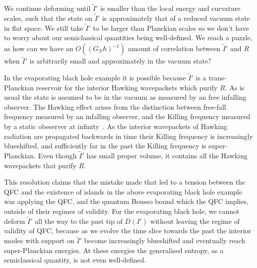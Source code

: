 \documentclass[a4paper,11pt]{article}
\begin{document}
\iffalse

We continue deforming until $\tilde{I}'$ is smaller than the local energy and curvature scales, such that the state on $\tilde{I}'$ is approximately that of a reduced vacuum state in flat space. We still take $\tilde{I}'$ to be larger than Planckian scales so we don't have to worry about our semiclassical quantities being well-defined. We reach a puzzle, as how can we have an $O((G_{N}\hbar)^{-1})$ amount of correlation between $\tilde{I}'$ and $R$ when $\tilde{I}'$ is arbitrarily small and approximately in the vacuum state? 

In the evaporating black hole example it is possible because $\tilde{I}'$ is a trans-Planckian reservoir for the interior Hawking wavepackets which purify $R$. As is usual the state 
is assumed to be in the vacuum as measured by an free infalling observer. The Hawking effect arises from the distinction between free-fall frequency measured by an infalling observer, and the Killing frequency measured by a static obeserver at infinity~\cite{Hawking1975}. As the interior wavepackets of Hawking radiation are propagated backwards in time their Killing frequency is increasingly blueshifted, and sufficiently far in the past the Killing frequency is super-Planckian. Even though $\tilde{I}'$ has small proper volume, it contains all the Hawking wavepackets that purify $R$. 

This resolution claims that the mistake made that led to a tension between the QFC and the existence of islands in the above evaporating black hole example was applying the QFC, and the quantum Bousso bound which the QFC implies, outside of their regimes of validity. For the evaporating black hole, we cannot deform $\tilde{I}'$ all the way to the past tip of $D(I')$ without leaving the regime of validity of QFC, because as we evolve the time slice towards the past the interior modes with support on $\tilde{I}'$ become increasingly blueshifted and eventually reach super-Planckian energies. At these energies the generalised entropy, as a semiclassical quantity, is not even well-defined.


\end{document}
